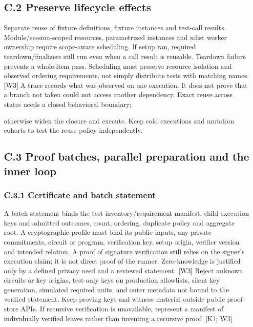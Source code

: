 \subsection*{C.2 Preserve lifecycle effects}

Separate reuse of fixture definitions, fixture instances and test-call results. Module/session-scoped
resources, parametrized instances and xdist worker ownership require scope-aware scheduling. If
setup ran, required teardown/finalizers still run even when a call result is reusable. Teardown failure
prevents a whole-item pass. Scheduling must preserve resource isolation and observed ordering
requirements, not simply distribute tests with matching names. [W3]
A trace records what was observed on one execution. It does not prove that a branch not taken
could not access another dependency. Exact reuse across states needs a closed behavioral boundary;


otherwise widen the closure and execute. Keep cold executions and mutation cohorts to test the reuse
policy independently.

\subsection*{C.3 Proof batches, parallel preparation and the inner loop}

\subsubsection*{C.3.1 Certificate and batch statement}

A batch statement binds the test inventory/requirement manifest, child execution keys and admitted
outcomes, count, ordering, duplicate policy and aggregate root. A cryptographic profile must bind its
public inputs, any private commitments, circuit or program, verification key, setup origin, verifier
version and intended relation. A proof of signature verification still relies on the signer’s execution
claim; it is not direct proof of the runner. Zero-knowledge is justified only by a defined privacy need
and a reviewed statement. [W3]
Reject unknown circuits or key origins, test-only keys on production allowlists, silent key generation,
simulated required units, and outer metadata not bound to the verified statement. Keep proving
keys and witness material outside public proof-store APIs. If recursive verification is unavailable,
represent a manifest of individually verified leaves rather than inventing a recursive proof. [K1; W3]

